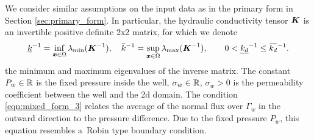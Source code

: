We consider similar assumptions on the input data as in the primary form in Section \ref{sec:primary_form}.
In particular, the hydraulic conductivity tensor $\mathbf{\boldsymbol{K}}$ is an invertible
positive definite 2x2 matrix, for which we denote
\begin{equation}
    \underline{k}^{-1} = \inf\limits_{\bx\in\Omega}\lambda_{\min}(\vc K^{-1}), \quad
    \overbar{k}^{-1}   = \sup\limits_{\bx\in\Omega}\lambda_{\max}(\vc K^{-1}), \qquad
     0 < \underline{k_d}^{-1} \leq \overbar{k_d}^{-1}.
\end{equation}
the minimum and maximum eigenvalues of the inverse matrix.
The constant $P_w\in\mathbb{R}$ is the fixed pressure inside the well, $\sigma_w\in\mathbb{R}$, $\sigma_w>0$ is the
permeability coefficient between the well and the 2d domain.
The condition \eqref{eqn:mixed_form_3} relates the average of the normal flux over $\Gamma_w$ in the outward direction
to the pressure difference. Due to the fixed pressure $P_w$, this equation resembles a~Robin type boundary condition.

